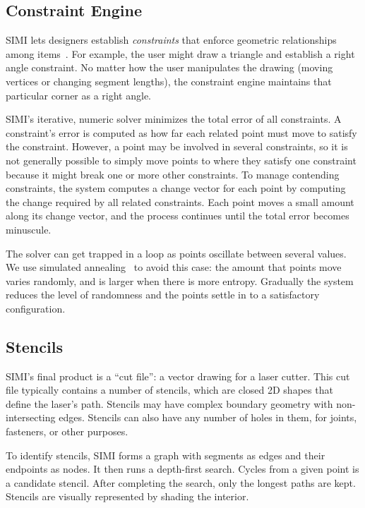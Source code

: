 \documentclass{article}
\begin{document}

\subsection{Constraint Engine}

SIMI lets designers establish \textit{constraints} that enforce
geometric relationships among items~\cite{borning-thinglab}. For
example, the user might draw a triangle and establish a right angle
constraint. No matter how the user manipulates the drawing (moving
vertices or changing segment lengths), the constraint engine maintains
that particular corner as a right angle.

SIMI's iterative, numeric solver minimizes the total error of all
constraints. A constraint's error is computed as how far each related
point must move to satisfy the constraint. However, a point may be
involved in several constraints, so it is not generally possible to
simply move points to where they satisfy one constraint because it
might break one or more other constraints. To manage contending
constraints, the system computes a change vector for each point by
computing the change required by all related constraints. Each point
moves a small amount along its change vector, and the process
continues until the total error becomes minuscule.

The solver can get trapped in a loop as points oscillate between
several values. We use simulated annealing~\cite{metropolis-annealing}
to avoid this case: the amount that points move varies randomly, and
is larger when there is more entropy. Gradually the system reduces the
level of randomness and the points settle in to a satisfactory
configuration.

\subsection{Stencils}

SIMI's final product is a ``cut file'': a vector drawing for a laser
cutter. This cut file typically contains a number of stencils, which
are closed 2D shapes that define the laser's path. Stencils may have
complex boundary geometry with non-intersecting edges. Stencils can
also have any number of holes in them, for joints, fasteners, or other
purposes.

To identify stencils, SIMI forms a graph with segments as edges and
their endpoints as nodes. It then runs a depth-first search. Cycles
from a given point is a candidate stencil. After completing the
search, only the longest paths are kept. Stencils are visually
represented by shading the interior.
\end{document}
